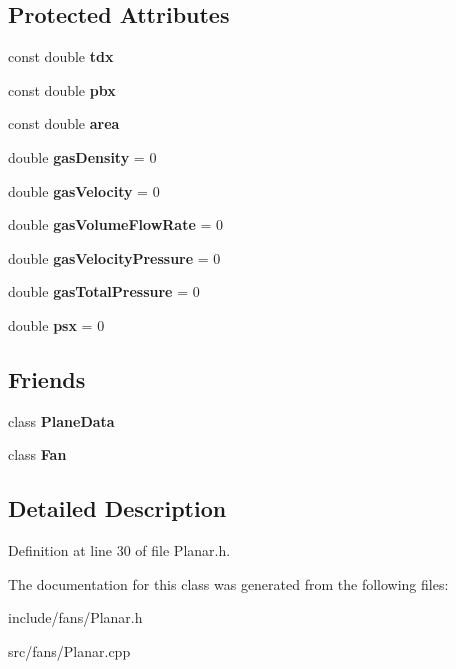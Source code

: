 \subsection*{Protected Attributes}
\begin{DoxyCompactItemize}
\item 
\mbox{\label{class_planar_a7e2b4d44fddc320e834163c16266c44e}} 
const double {\bfseries tdx}
\item 
\mbox{\label{class_planar_a18ed8bdd4d3e0766c349cf3ed1482a40}} 
const double {\bfseries pbx}
\item 
\mbox{\label{class_planar_a561590931d1cb7b592eeba9f3685d3c3}} 
const double {\bfseries area}
\item 
\mbox{\label{class_planar_a3585f60cf8a2a9e4b80954118337c8cf}} 
double {\bfseries gas\+Density} = 0
\item 
\mbox{\label{class_planar_adf99a402e9af6a851ee94bd8dad5700a}} 
double {\bfseries gas\+Velocity} = 0
\item 
\mbox{\label{class_planar_a6597ec3a9de6863ecfe3c5e923048783}} 
double {\bfseries gas\+Volume\+Flow\+Rate} = 0
\item 
\mbox{\label{class_planar_a4bec44a97d38f8b98d3839c885350512}} 
double {\bfseries gas\+Velocity\+Pressure} = 0
\item 
\mbox{\label{class_planar_a67711087a384aa3165fb7990e72193c5}} 
double {\bfseries gas\+Total\+Pressure} = 0
\item 
\mbox{\label{class_planar_a1ae78fa44af29939b09ad5262788b981}} 
double {\bfseries psx} = 0
\end{DoxyCompactItemize}
\subsection*{Friends}
\begin{DoxyCompactItemize}
\item 
\mbox{\label{class_planar_a28ff438eefb65e97bddb4051dd0a0112}} 
class {\bfseries Plane\+Data}
\item 
\mbox{\label{class_planar_a0a305abd4183ca4b5d3adb1b563378d7}} 
class {\bfseries Fan}
\end{DoxyCompactItemize}


\subsection{Detailed Description}


Definition at line 30 of file Planar.\+h.



The documentation for this class was generated from the following files\+:\begin{DoxyCompactItemize}
\item 
include/fans/Planar.\+h\item 
src/fans/Planar.\+cpp\end{DoxyCompactItemize}
